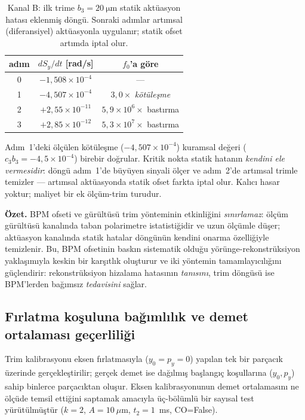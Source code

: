 \documentclass[preprint,12pt]{elsarticle}
\begin{document}
\begin{table}[h]
\centering
\caption{Kanal B: ilk trime $b_3=\SI{20}{\micro\meter}$ statik aktüasyon
hatası eklenmiş döngü. Sonraki adımlar artımsal (diferansiyel)
aktüasyonla uygulanır; statik ofset artımda iptal olur.}
\label{tab:trim-bpm}
\begin{tabular}{ccc}
\toprule
adım & $dS_y/dt$ [rad/s] & $f_0$'a göre \\
\midrule
0 & $-1{,}508\times10^{-4}$ & --- \\
1 & $-4{,}507\times10^{-4}$ & $3{,}0\times$ \emph{kötüleşme} \\
2 & $+2{,}55\times10^{-11}$ & $5{,}9\times10^{6}\times$ bastırma \\
3 & $+2{,}85\times10^{-12}$ & $5{,}3\times10^{7}\times$ bastırma \\
\bottomrule
\end{tabular}
\end{table}

Adım~1'deki ölçülen kötüleşme ($-4{,}507\times10^{-4}$) kuramsal değeri
($c_3 b_3 = -4{,}5\times10^{-4}$) birebir doğrular. Kritik nokta statik
hatanın \emph{kendini ele vermesidir}: döngü adım~1'de büyüyen sinyali
ölçer ve adım~2'de artımsal trimle temizler — artımsal aktüasyonda statik
ofset farkta iptal olur. Kalıcı hasar yoktur; maliyet bir ek ölçüm-trim
turudur.

\textbf{Özet.} BPM ofseti ve gürültüsü trim yönteminin etkinliğini
\emph{sınırlamaz}: ölçüm gürültüsü kanalında taban polarimetre
istatistiğidir ve uzun ölçümle düşer; aktüasyon kanalında statik hatalar
döngünün kendini onarma özelliğiyle temizlenir. Bu, BPM ofsetinin baskın
sistematik olduğu yörünge-rekonstrüksiyon yaklaşımıyla keskin bir
karşıtlık oluşturur ve iki yöntemin tamamlayıcılığını güçlendirir:
rekonstrüksiyon hizalama hatasının \emph{tanısını}, trim döngüsü ise
BPM'lerden bağımsız \emph{tedavisini} sağlar.

\subsection{Fırlatma koşuluna bağımlılık ve demet ortalaması geçerliliği}
\label{sec:trim-launch}

Trim kalibrasyonu eksen fırlatmasıyla ($y_0=p_y=0$) yapılan tek bir
parçacık üzerinde gerçekleştirilir; gerçek demet ise dağılmış başlangıç
koşullarına ($y_0,p_y$) sahip binlerce parçacıktan oluşur. Eksen
kalibrasyonunun demet ortalamasını ne ölçüde temsil ettiğini saptamak
amacıyla üç-bölümlü bir sayısal test yürütülmüştür ($k=2$, $A=10~\mu$m,
$t_2=1$~ms, CO=False).
\end{document}
